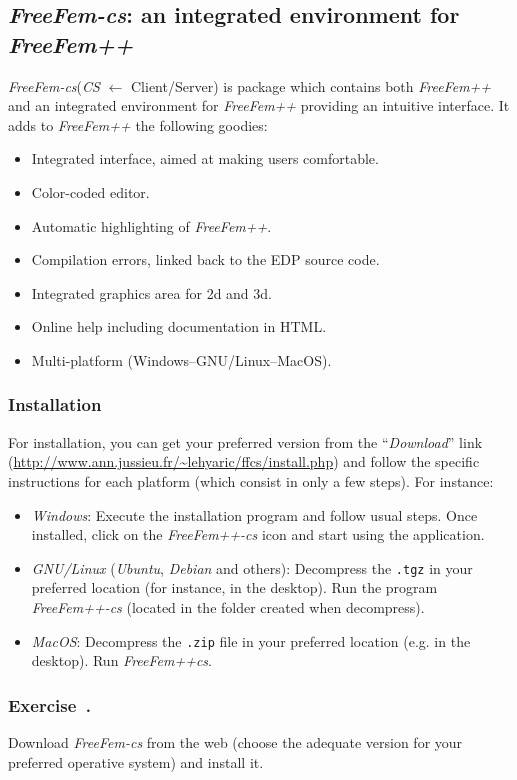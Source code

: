 \documentclass[12pt]{article}
\newcommand{\FF}{\textit{FreeFem++}\xspace}
\newcommand{\FFcs}{\textit{FreeFem-cs}\xspace}
\newcounter{exercise}
\newenvironment{exercise}{%
  \stepcounter{exercise}
  \subsubsection*{Exercise~\theexercise.}}
{}
\begin{document}
\subsection{\FFcs: an integrated environment for \FF}
\label{sec:freefem-CS}

\FFcs (\textit{CS} $\leftarrow$ Client/Server) is package which contains
both \FF and an integrated environment for \FF providing an intuitive
interface. It adds to \FF the following goodies:
\begin{itemize}
\item Integrated interface, aimed at making users comfortable.
\item Color-coded editor.
\item Automatic highlighting of \FF.
\item Compilation errors, linked back to the EDP source code.
\item Integrated graphics area for 2d and 3d.
\item Online help including documentation in HTML.
\item Multi-platform (Windows--GNU/Linux--MacOS).
\end{itemize}


\subsubsection{Installation}
For installation, you can get your preferred version from
the ``\textit{Download}'' link
(\url{http://www.ann.jussieu.fr/~lehyaric/ffcs/install.php}) and
follow the specific instructions for each  platform (which consist in
only a few steps). For instance:

\begin{itemize}
\item \textit{Windows}: Execute the installation program and follow
  usual steps. Once installed, click on the \textit{FreeFem++-cs} icon
  and start using the application.
\item \textit{GNU/Linux} (\textit{Ubuntu}, \textit{Debian} and
  others): Decompress the \texttt{.tgz} in your preferred location (for
  instance, in the desktop). Run the program \textit{FreeFem++-cs}
  (located in the folder created when decompress).
\item \textit{MacOS}: Decompress the \texttt{.zip} file in your
  preferred location (e.g. in the desktop). Run \textit{FreeFem++cs}.
\end{itemize}

\begin{exercise}
  Download \FFcs from the web (choose the adequate version for your
  preferred operative system) and install it.
\end{exercise}
\end{document}
